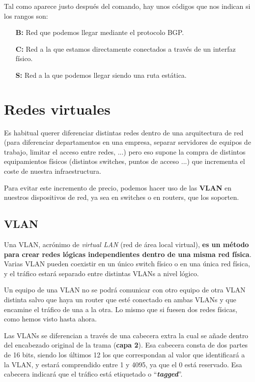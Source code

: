 Tal como aparece justo después del comando, hay unos códigos que nos indican si los rangos son:
\begin{itemize}
    \item[\textbf{B:}] Red que podemos llegar mediante el protocolo BGP.
    \item[\textbf{C:}] Red a la que estamos directamente conectados a través de un interfaz físico.
    \item[\textbf{S:}] Red a la que podemos llegar siendo una ruta estática.
\end{itemize}



\chapter{Redes virtuales}
Es habitual querer diferenciar distintas redes dentro de una arquitectura de red (para diferenciar departamentos en una empresa, separar servidores de equipos de trabajo, limitar el acceso entre redes, ...) pero eso supone la compra de distintos equipamientos físicos (distintos switches, puntos de acceso ...) que incrementa el coste de nuestra infraestructura.

Para evitar este incremento de precio, podemos hacer uso de las \textbf{VLAN} en nuestros dispositivos de red, ya sea en switches o en routers, que los soporten.

\section{VLAN}
Una VLAN, acrónimo de \textit{virtual LAN} (red de área local virtual), \textbf{es un método para crear redes lógicas independientes dentro de una misma red física}. Varias VLAN pueden coexistir en un único switch físico o en una única red física, y el tráfico estará separado entre distintas VLANs a nivel lógico.

Un equipo de una VLAN no se podrá comunicar con otro equipo de otra VLAN distinta salvo que haya un router que esté conectado en ambas VLANs y que encamine el tráfico de una a la otra. Lo mismo que si fuesen dos redes físicas, como hemos visto hasta ahora.

Las VLANs se diferencian a través de una cabecera extra la cual se añade dentro del encabezado original de la trama (\textbf{capa 2}). Esa cabecera consta de dos partes de 16 bits, siendo los últimos 12 los que correspondan al valor que identificará a la VLAN, y estará comprendido entre 1 y 4095, ya que el 0 está reservado. Esa cabecera indicará que el tráfico está etiquetado o “\textit{\textbf{tagged}}”.

